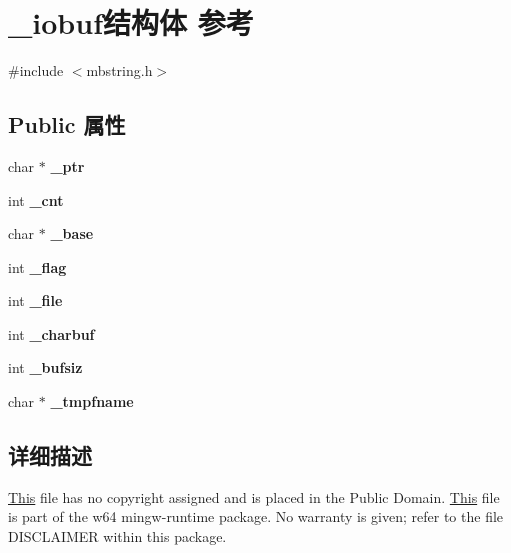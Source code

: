 \hypertarget{struct__iobuf}{}\section{\+\_\+iobuf结构体 参考}
\label{struct__iobuf}


{\ttfamily \#include $<$mbstring.\+h$>$}

\subsection*{Public 属性}
\begin{DoxyCompactItemize}
\item 
\mbox{\label{struct__iobuf_a2e409803d95a8959f9982fa9870fd343}} 
char $\ast$ {\bfseries \+\_\+ptr}
\item 
\mbox{\label{struct__iobuf_a4a9e10920e99b837b0dd9b7bb1c164b5}} 
int {\bfseries \+\_\+cnt}
\item 
\mbox{\label{struct__iobuf_a341cdfc7b1263006d914976f321b1eb7}} 
char $\ast$ {\bfseries \+\_\+base}
\item 
\mbox{\label{struct__iobuf_a91fe8fc76ef7b970522c96bdc9c843cf}} 
int {\bfseries \+\_\+flag}
\item 
\mbox{\label{struct__iobuf_a8c02e2aa48f797154518ec4daac2e026}} 
int {\bfseries \+\_\+file}
\item 
\mbox{\label{struct__iobuf_a3304634683fffee8022d0d9ecaebb903}} 
int {\bfseries \+\_\+charbuf}
\item 
\mbox{\label{struct__iobuf_aeb67e1186cdbbb61f2130649d11a1198}} 
int {\bfseries \+\_\+bufsiz}
\item 
\mbox{\label{struct__iobuf_ae6d709129f8573217bc34861ae07bfee}} 
char $\ast$ {\bfseries \+\_\+tmpfname}
\end{DoxyCompactItemize}


\subsection{详细描述}
\hyperlink{namespace_this}{This} file has no copyright assigned and is placed in the Public Domain. \hyperlink{namespace_this}{This} file is part of the w64 mingw-\/runtime package. No warranty is given; refer to the file D\+I\+S\+C\+L\+A\+I\+M\+ER within this package. 

